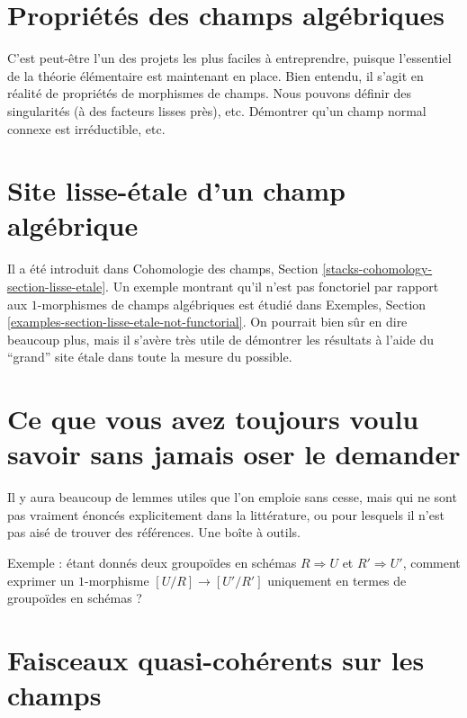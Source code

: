 \section{Propriétés des champs algébriques}
\label{section-stacks-properties}

\noindent
C'est peut-être l'un des projets les plus faciles à entreprendre, puisque l'essentiel de la
théorie élémentaire est maintenant en place. Bien entendu, il s'agit en réalité de propriétés
de morphismes de champs. Nous pouvons définir des singularités (à des facteurs lisses près),
etc. Démontrer qu'un champ normal connexe est irréductible, etc.


\section{Site lisse-\'etale d'un champ algébrique}
\label{section-lisse-etale}

\noindent
Il a été introduit dans
Cohomologie des champs, Section \ref{stacks-cohomology-section-lisse-etale}.
Un exemple montrant qu'il n'est pas fonctoriel par rapport aux $1$-morphismes
de champs algébriques est étudié dans
Exemples, Section \ref{examples-section-lisse-etale-not-functorial}.
On pourrait bien sûr en dire beaucoup plus, mais il s'avère
très utile de démontrer les résultats à l'aide du ``grand'' site \'etale
dans toute la mesure du possible.



\section{Ce que vous avez toujours voulu savoir sans jamais oser le demander}
\label{section-stacks-fun-lemmas}

\noindent
Il y aura beaucoup de lemmes utiles que l'on emploie sans cesse,
mais qui ne sont pas vraiment énoncés explicitement dans la littérature,
ou pour lesquels il n'est pas aisé de trouver des références. Une boîte à outils.

\medskip\noindent
Exemple : étant donnés deux groupoïdes en schémas $R\Rightarrow U$ et
$R' \Rightarrow U'$, comment exprimer un $1$-morphisme
$[U/R] \to [U'/R']$ uniquement en termes de groupoïdes en schémas ?



\section{Faisceaux quasi-cohérents sur les champs}
\label{section-quasi-coherent}

